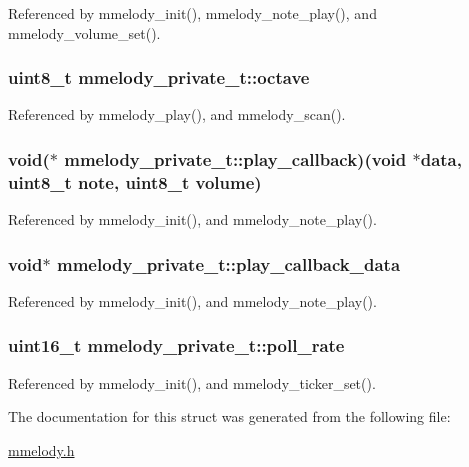 Referenced by mmelody\_\-init(), mmelody\_\-note\_\-play(), and mmelody\_\-volume\_\-set().\hypertarget{structmmelody__private__t_7dea2b1d92501ff4fa579eb07e56f9a5}{
\subsubsection{\setlength{\rightskip}{0pt plus 5cm}uint8\_\-t {\bf mmelody\_\-private\_\-t::octave}}}
\label{structmmelody__private__t_7dea2b1d92501ff4fa579eb07e56f9a5}




Referenced by mmelody\_\-play(), and mmelody\_\-scan().\hypertarget{structmmelody__private__t_5b9291604e0066d7fea5ead273e58fd8}{
\subsubsection{\setlength{\rightskip}{0pt plus 5cm}void($\ast$  {\bf mmelody\_\-private\_\-t::play\_\-callback})(void $\ast$data, uint8\_\-t note, uint8\_\-t {\bf volume})}}
\label{structmmelody__private__t_5b9291604e0066d7fea5ead273e58fd8}




Referenced by mmelody\_\-init(), and mmelody\_\-note\_\-play().\hypertarget{structmmelody__private__t_17170c6a0f5b7b444de5b4faa8a6d194}{
\subsubsection{\setlength{\rightskip}{0pt plus 5cm}void$\ast$ {\bf mmelody\_\-private\_\-t::play\_\-callback\_\-data}}}
\label{structmmelody__private__t_17170c6a0f5b7b444de5b4faa8a6d194}




Referenced by mmelody\_\-init(), and mmelody\_\-note\_\-play().\hypertarget{structmmelody__private__t_838a62c5c15a98ab15702ccd0168fc54}{
\subsubsection{\setlength{\rightskip}{0pt plus 5cm}uint16\_\-t {\bf mmelody\_\-private\_\-t::poll\_\-rate}}}
\label{structmmelody__private__t_838a62c5c15a98ab15702ccd0168fc54}




Referenced by mmelody\_\-init(), and mmelody\_\-ticker\_\-set().

The documentation for this struct was generated from the following file:\begin{CompactItemize}
\item 
\hyperlink{mmelody_8h}{mmelody.h}\end{CompactItemize}
